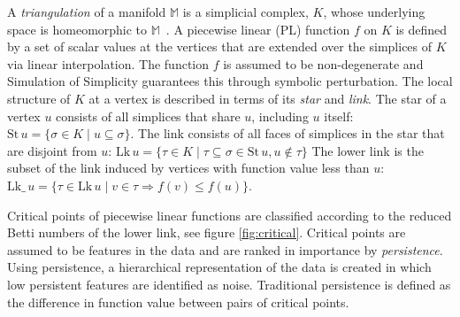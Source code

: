 A \emph{triangulation} of a manifold $\mathbb{M}$ is a simplicial complex, $K$, 
whose underlying space is homeomorphic to $\mathbb{M}$~\cite{Alexandrov:Topology}.  
A piecewise linear (PL) function $f$ on $K$ is defined by a set of scalar values
at the vertices that are extended over the simplices of
$K$ via linear interpolation. The function $f$ is assumed to be
non-degenerate and Simulation of Simplicity \cite{Edelsbrunner:SOS} guarantees 
this through symbolic perturbation.
The local structure of $K$ at a vertex is described in terms 
of its \emph{star} and \emph{link}.  The
star of a vertex $u$ consists of all simplices that share $u$, including $u$
itself: $\mathrm{St}\,u  =  \{\sigma \in K \mid u \subseteq \sigma\}$.
The link consists of all faces of simplices in the star that are
disjoint from $u$: $\mathrm{Lk}\,u  =  \{\tau \in K \mid \tau \subseteq \sigma \in
                          \mathrm{St}\,u, u \notin \tau \}$
The lower link is the subset of the link induced by vertices
with function value less than $u$: 
  $\mathrm{Lk}\_\,u  =  \{\tau \in \mathrm{Lk}\,u \mid v \in \tau \Rightarrow
                          f(v) \leq f(u) \} $.

Critical points of piecewise linear functions are classified according to
the reduced Betti numbers \cite{Munkres:Topology} of the lower link, see figure 
\ref{fig:critical}.  
Critical points are assumed to be features in the data and are ranked in
importance by \emph{persistence}. Using persistence, a hierarchical
representation of the data is created in which low persistent features are
identified as noise.  Traditional persistence
\cite{Edelsbrunner:TopoPersistence} is defined as the difference in function
value between pairs of critical points.  

